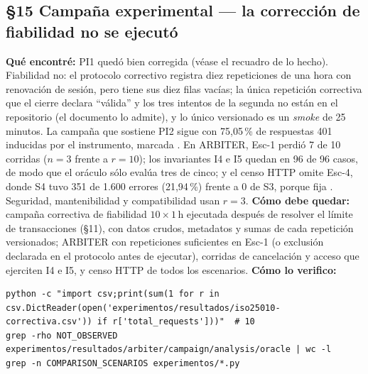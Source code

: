 \subsection*{\S15 Campa\~na experimental --- la correcci\'on de fiabilidad no se ejecut\'o}
\textbf{Qu\'e encontr\'e:} PI1 qued\'o bien corregida (v\'ease el recuadro de lo hecho). Fiabilidad no: el protocolo correctivo registra diez repeticiones de una hora con renovaci\'on de sesi\'on, pero  tiene sus diez filas vac\'ias; la \'unica repetici\'on correctiva que el cierre declara ``v\'alida'' y los tres intentos de la segunda no est\'an en el repositorio (el documento lo admite), y lo \'unico versionado es un \emph{smoke} de 25 minutos. La campa\~na que sostiene PI2 sigue con 75,05\,\% de respuestas 401 inducidas por el instrumento, marcada . En ARBITER, Esc-1 perdi\'o 7 de 10 corridas ($n=3$ frente a $r=10$); los invariantes I4 e I5 quedan  en 96 de 96 casos, de modo que el or\'aculo s\'olo eval\'ua tres de cinco; y el censo HTTP omite Esc-4, donde S4 tuvo 351 de 1.600 errores (21,94\,\%) frente a 0 de S3, porque  fija . Seguridad, mantenibilidad y compatibilidad usan $r=3$. \textbf{C\'omo debe quedar:} campa\~na correctiva de fiabilidad $10\times1$\,h ejecutada despu\'es de resolver el l\'imite de transacciones (\S11), con datos crudos, metadatos y sumas de cada repetici\'on versionados; ARBITER con repeticiones suficientes en Esc-1 (o exclusi\'on declarada en el protocolo antes de ejecutar), corridas de cancelaci\'on y acceso que ejerciten I4 e I5, y censo HTTP de todos los escenarios. \textbf{C\'omo lo verifico:}\begin{verbatim}
python -c "import csv;print(sum(1 for r in csv.DictReader(open('experimentos/resultados/iso25010-correctiva.csv')) if r['total_requests']))"  # 10
grep -rho NOT_OBSERVED experimentos/resultados/arbiter/campaign/analysis/oracle | wc -l
grep -n COMPARISON_SCENARIOS experimentos/*.py
\end{verbatim}

